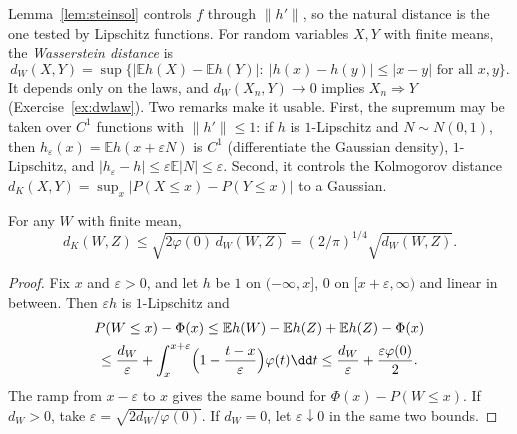 Lemma~\ref{lem:steinsol} controls $f$ through $\|h'\|$, so the natural distance is the one tested by Lipschitz functions. For random variables $X,Y$ with
finite means, the \emph{Wasserstein distance} is
\[
d_W(X,Y)=\sup\bigl\{|\mathbb Eh(X)-\mathbb Eh(Y)|:\ |h(x)-h(y)|\le|x-y|\text{ for all }x,y\bigr\}.
\]
It depends only on the laws, and $d_W(X_n,Y)\to0$ implies $X_n\Rightarrow Y$ (Exercise~\ref{ex:dwlaw}). Two remarks make it usable. First, the supremum may be taken
over $C^1$ functions with $\|h'\|\le1$: if $h$ is $1$-Lipschitz and $N\sim N(0,1)$, then $h_\varepsilon(x)=\mathbb Eh(x+\varepsilon N)$ is $C^1$ (differentiate the Gaussian
density), $1$-Lipschitz, and $|h_\varepsilon-h|\le\varepsilon\mathbb E|N|\le\varepsilon$. Second, it controls the Kolmogorov distance
$d_K(X,Y)=\sup_x|P(X\le x)-P(Y\le x)|$ to a Gaussian.

\begin{proposition}\label{prop:dkdw}
For any $W$ with finite mean,
\[
d_K(W,Z)\le\sqrt{2\varphi(0)\,d_W(W,Z)}=(2/\pi)^{1/4}\sqrt{d_W(W,Z)}.
\]
\end{proposition}
\begin{proof}
Fix $x$ and $\varepsilon>0$, and let $h$ be $1$ on $(-\infty,x]$, $0$ on $[x+\varepsilon,\infty)$ and linear in between. Then $\varepsilon h$ is $1$-Lipschitz and
\[
\begin{gathered}
P(W\le x)-\Phi(x)\le\mathbb Eh(W)-\mathbb Eh(Z)+\mathbb Eh(Z)-\Phi(x)\\\le\frac{d_W}\varepsilon+\int_x^{x+\varepsilon}\Bigl(1-\frac{t-x}\varepsilon\Bigr)\varphi(t)\dd t
\le\frac{d_W}\varepsilon+\frac{\varepsilon\varphi(0)}2.
\end{gathered}
\]
The ramp from $x-\varepsilon$ to $x$ gives the same bound for $\Phi(x)-P(W\le x)$. If $d_W>0$, take $\varepsilon=\sqrt{2d_W/\varphi(0)}$. If $d_W=0$, let $\varepsilon\downarrow0$ in the same two bounds.
\end{proof}

